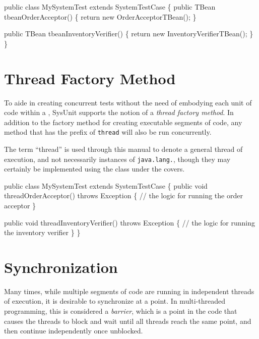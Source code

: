 \begin{codelisting}
public class MySystemTest
  extends SystemTestCase
\{
    public TBean tbeanOrderAcceptor()
    \{
        return new OrderAcceptorTBean();
    \}

    public TBean tbeanInventoryVerifier()
    \{
        return new InventoryVerifierTBean();
    \}
\}
\end{codelisting}

\section{Thread Factory Method}

To aide in creating concurrent tests without the need of
embodying each unit of code within a , SysUnit
supports the notion of a \emph{thread factory method}.
In addition to the  factory method for creating executable
segments of code, any method that has the prefix of \texttt{thread}
will also be run concurrently.

\begin{note}
The term ``thread'' is used through this manual to denote a
general thread of execution, and not necessarily instances of
\texttt{java.lang.}, though they may certainly be
implemented using the  class under the covers.
\end{note}

\begin{codelisting}
public class MySystemTest
  extends SystemTestCase
\{
    public void threadOrderAcceptor()
        throws Exception
    \{
         // the logic for running the order acceptor
    \}

    public void threadInventoryVerifier()
        throws Exception
    \{
         // the logic for running the inventory verifier
    \}
\}
\end{codelisting}

\section{Synchronization}

Many times, while multiple segments of code are running in independent
threads of execution, it is desirable to synchronize at a point.  In
multi-threaded programming, this is considered a
\emph{barrier},
which is a point in the code that causes the threads to block and wait
until all threads reach the same point, and then continue
independently once unblocked.

